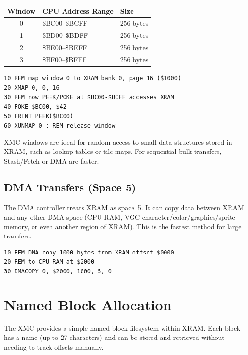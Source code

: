 \begin{center}
\small
\begin{tabular}{@{}cll@{}}
\toprule
\textbf{Window} & \textbf{CPU Address Range} & \textbf{Size} \\
\midrule
0 & \$BC00--\$BCFF & 256 bytes \\
1 & \$BD00--\$BDFF & 256 bytes \\
2 & \$BE00--\$BEFF & 256 bytes \\
3 & \$BF00--\$BFFF & 256 bytes \\
\bottomrule
\end{tabular}
\end{center}

\begin{lstlisting}
10 REM map window 0 to XRAM bank 0, page 16 ($1000)
20 XMAP 0, 0, 16
30 REM now PEEK/POKE at $BC00-$BCFF accesses XRAM
40 POKE $BC00, $42
50 PRINT PEEK($BC00)
60 XUNMAP 0 : REM release window
\end{lstlisting}

\begin{tipbox}
XMC windows are ideal for random access to small data structures stored in XRAM,
such as lookup tables or tile maps.  For sequential bulk transfers, Stash/Fetch
or DMA are faster.
\end{tipbox}

\subsection{DMA Transfers (Space 5)}

The DMA controller treats XRAM as space~5.  It can copy data between XRAM and
any other DMA space (CPU RAM, VGC character/color/graphics/sprite memory, or
even another region of XRAM).  This is the fastest method for large transfers.

\begin{lstlisting}
10 REM DMA copy 1000 bytes from XRAM offset $0000
20 REM to CPU RAM at $2000
30 DMACOPY 0, $2000, 1000, 5, 0
\end{lstlisting}


\section{Named Block Allocation}
\label{sec:xram-named}

The XMC provides a simple named-block filesystem within XRAM.  Each block has a
name (up to 27 characters) and can be stored and retrieved without needing to
track offsets manually.

